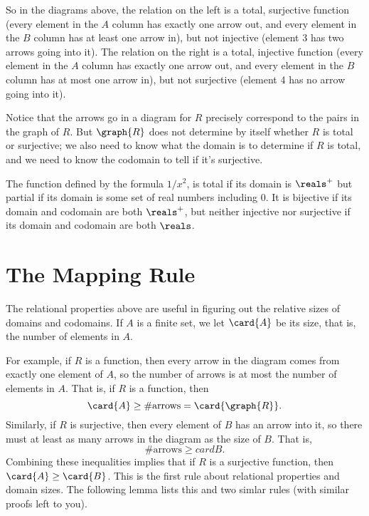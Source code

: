 So in the diagrams above, the relation on the left is a total, surjective
function (every element in the $A$ column has exactly one arrow out, and
every element in the $B$ column has at least one arrow in), but not
injective (element 3 has two arrows going into it).  The relation on the
right is a total, injective function (every element in the $A$ column has
exactly one arrow out, and every element in the $B$ column has at most one
arrow in), but not surjective (element 4 has no arrow going into it).

Notice that the arrows go in a diagram for $R$ precisely correspond to the
pairs in the graph of $R$.  But $\graph{R}$ does not determine by itself
whether $R$ is total or surjective; we also need to know what the domain
is to determine if $R$ is total, and we need to know the codomain to tell
if it's surjective.
\begin{example}
  The function defined by the formula $1/x^2$, is total if its domain is
  $\reals^+$ but partial if its domain is some set of real numbers
  including 0.  It is bijective if its domain and codomain are both
  $\reals^+$, but neither injective nor surjective if its domain and
  codomain are both $\reals$.
\end{example}


\section{The Mapping Rule}

The relational properties above are useful in figuring out the relative
sizes of domains and codomains.  If $A$ is a finite set, we let $\card{A}$
be its size, that is, the number of elements in $A$.

For example, if $R$ is a function, then every arrow in the diagram comes
from exactly one element of $A$, so the number of arrows is at most the
number of elements in $A$.  That is, if $R$ is a function, then
\[
\card{A} \geq \#\text{arrows} = \card{\graph{R}}.
\]
Similarly, if $R$ is surjective, then every element of $B$ has an arrow
into it, so there must at least as many arrows in the diagram as the size
of $B$.  That is,
\[
\#\text{arrows} \geq card{B}.
\]
Combining these inequalities implies that if $R$ is a surjective function,
then $\card{A} \geq \card{B}$.  This is the first rule about relational
properties and domain sizes.  The following lemma lists this and two
simlar rules (with similar proofs left to you).

